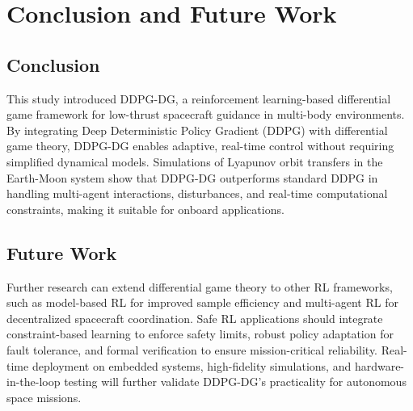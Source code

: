 \documentclass[conference]{IEEEtran}
\begin{document}



\section{Conclusion and Future Work}

\subsection{Conclusion}

This study introduced DDPG-DG, a reinforcement learning-based differential game framework for low-thrust spacecraft guidance in multi-body environments. By integrating Deep Deterministic Policy Gradient (DDPG) with differential game theory, DDPG-DG enables adaptive, real-time control without requiring simplified dynamical models. Simulations of Lyapunov orbit transfers in the Earth-Moon system show that DDPG-DG outperforms standard DDPG in handling multi-agent interactions, disturbances, and real-time computational constraints, making it suitable for onboard applications.

\subsection{Future Work}

Further research can extend differential game theory to other RL frameworks, such as model-based RL for improved sample efficiency and multi-agent RL for decentralized spacecraft coordination. Safe RL applications should integrate constraint-based learning to enforce safety limits, robust policy adaptation for fault tolerance, and formal verification to ensure mission-critical reliability. Real-time deployment on embedded systems, high-fidelity simulations, and hardware-in-the-loop testing will further validate DDPG-DG’s practicality for autonomous space missions.
\end{document}
